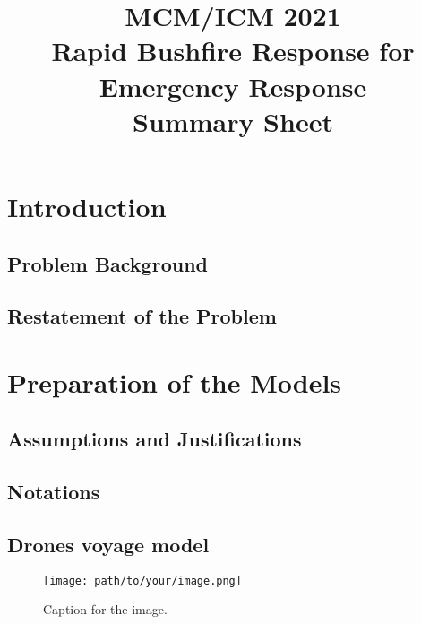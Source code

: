 \documentclass[12pt,a4paper]{article}
\title{
    \vspace{-2cm} %
    \Large MCM/ICM 2021\\
    \huge \textbf{Rapid Bushfire Response for Emergency Response}\\
    \large Summary Sheet
}
\author{}
\date{} %
\begin{document}
\maketitle %

\tableofcontents
\thispagestyle{fancy} %

\newpage

\section{Introduction}
\subsection{Problem Background}

\subsection{Restatement of the Problem}

\section{Preparation of the Models}
\subsection{Assumptions and Justifications}

\subsection{Notations}

\subsection{Drones voyage model}

\newpage

\begin{figure}[ht]
    \centering
    \texttt{[image: path/to/your/image.png]}
    \caption{Caption for the image.}
    \label{fig:my_label}
\end{figure}

\end{document}
